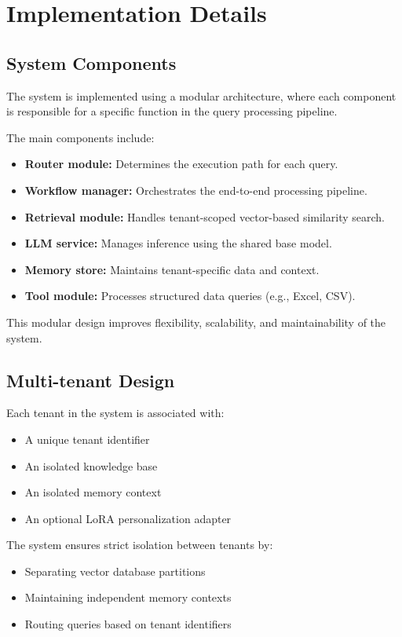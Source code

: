 \section{Implementation Details}

\subsection{System Components}

The system is implemented using a modular architecture, where each component is responsible for a specific function in the query processing pipeline.

The main components include:
\begin{itemize}
    \item \textbf{Router module:} Determines the execution path for each query.
    \item \textbf{Workflow manager:} Orchestrates the end-to-end processing pipeline.
    \item \textbf{Retrieval module:} Handles tenant-scoped vector-based similarity search.
    \item \textbf{LLM service:} Manages inference using the shared base model.
    \item \textbf{Memory store:} Maintains tenant-specific data and context.
    \item \textbf{Tool module:} Processes structured data queries (e.g., Excel, CSV).
\end{itemize}

This modular design improves flexibility, scalability, and maintainability of the system.

\subsection{Multi-tenant Design}

Each tenant in the system is associated with:
\begin{itemize}
    \item A unique tenant identifier
    \item An isolated knowledge base
    \item An isolated memory context
    \item An optional LoRA personalization adapter
\end{itemize}

The system ensures strict isolation between tenants by:
\begin{itemize}
    \item Separating vector database partitions
    \item Maintaining independent memory contexts
    \item Routing queries based on tenant identifiers
\end{itemize}

